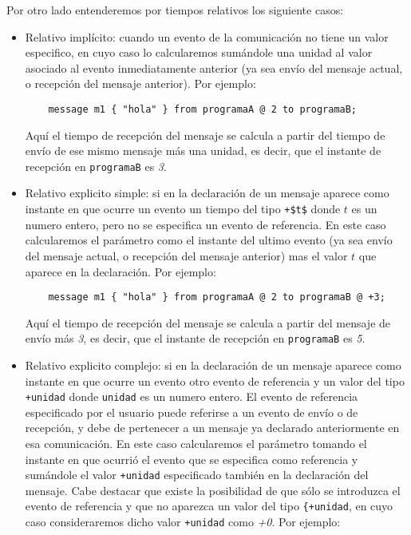 Por otro lado entenderemos por tiempos relativos los siguiente casos:

\begin{itemize}
\item Relativo implícito: cuando un evento de la comunicación no tiene
  un valor especifico, en cuyo caso lo calcularemos sumándole una unidad al
  valor asociado al evento inmediatamente anterior (ya sea envío del
  mensaje actual, o recepción del mensaje anterior). Por ejemplo:

  \begin{lstlisting}
    message m1 { "hola" } from programaA @ 2 to programaB;
  \end{lstlisting}

  Aquí el tiempo de recepción del mensaje se calcula a partir del
  tiempo de envío de ese mismo mensaje más una unidad, es decir, que
  el instante de recepción en \lstinline{programaB} es \textit{3}.

\item Relativo explicito simple: si en la declaración de un mensaje
  aparece como instante en que ocurre un evento un tiempo del tipo
  \lstinline[mathescape]{+$t$} donde $t$ es un numero 
  entero, pero no se especifica un evento de referencia. En este caso
  calcularemos el parámetro como el instante del ultimo evento (ya
  sea envío del mensaje actual, o recepción del mensaje anterior)
  mas el valor $t$ que aparece en la declaración. Por  
  ejemplo:
      
  \begin{lstlisting}
    message m1 { "hola" } from programaA @ 2 to programaB @ +3;
  \end{lstlisting}
      
  Aquí el tiempo de recepción del mensaje se calcula a partir del
  mensaje de envío más \textit{3}, es decir, que el instante de
  recepción en \lstinline{programaB} es \textit{5}.
\item Relativo explicito complejo: si en la declaración de un mensaje
  aparece como instante en que ocurre un evento otro evento de
  referencia y un valor del tipo \lstinline{+unidad} donde
  \lstinline{unidad} es un numero entero. El evento de referencia
  especificado por el usuario puede referirse a un evento de envío o
  de recepción, y debe de pertenecer a un mensaje ya declarado
  anteriormente en esa comunicación. En este caso calcularemos el
  parámetro tomando el instante en que ocurrió el evento que se
  especifica como referencia y sumándole el valor \lstinline{+unidad}
  especificado también en la declaración del mensaje. Cabe destacar
  que existe la posibilidad de que sólo se introduzca el evento de
  referencia y que no aparezca un valor del tipo \lstinline{{+unidad},
    en cuyo caso consideraremos dicho valor \lstinline{+unidad} como
    \textit{+0}. 
  Por ejemplo:


\end{itemize}
